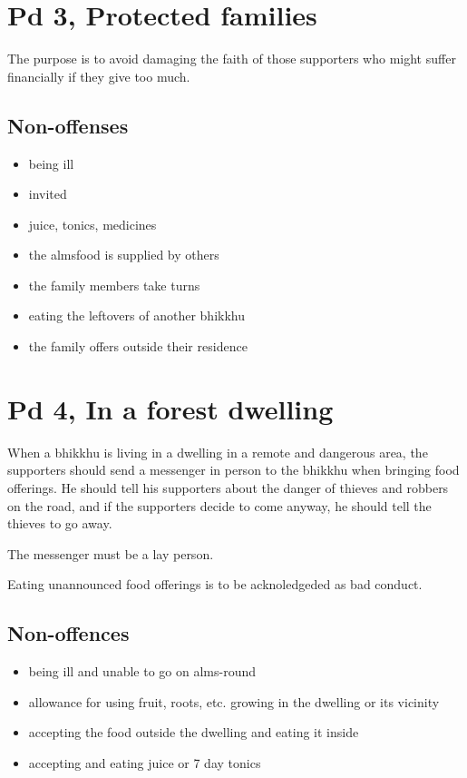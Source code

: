 \section{Pd 3, Protected families}

The purpose is to avoid damaging the faith of those supporters who might
suffer financially if they give too much.

\subsection{Non-offenses}

\begin{multicols}{2}

\begin{itemize}
\tightlist
\item
  being ill
\item
  invited
\item
  juice, tonics, medicines
\item
  the almsfood is supplied by others
\item
  the family members take turns
\item
  eating the leftovers of another bhikkhu
\item
  the family offers outside their residence
\end{itemize}

\end{multicols}

\section{Pd 4, In a forest dwelling}

When a bhikkhu is living in a dwelling in a remote and dangerous area,
the supporters should send a messenger in person to the bhikkhu when
bringing food offerings. He should tell his supporters about the danger
of thieves and robbers on the road, and if the supporters decide to come
anyway, he should tell the thieves to go away.

The messenger must be a lay person.

Eating unannounced food offerings is to be acknoledgeded as bad conduct.

\subsection{Non-offences}

\begin{itemize}
\tightlist
\item
  being ill and unable to go on alms-round
\item
  allowance for using fruit, roots, etc. growing in the dwelling or its
  vicinity
\item
  accepting the food outside the dwelling and eating it inside
\item
  accepting and eating juice or 7 day tonics
\end{itemize}

